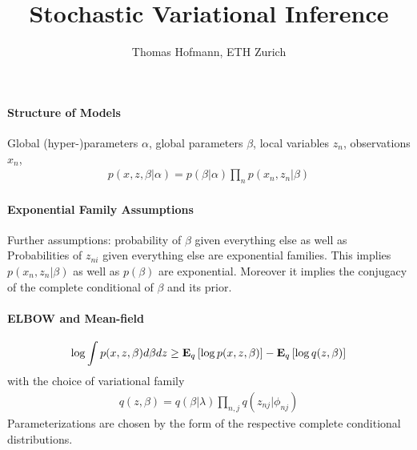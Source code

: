 \documentclass{article}
\title{Stochastic Variational Inference}
\author{Thomas Hofmann, ETH Zurich}
\newcommand{\E}{{\bf E}}
\begin{document}
\maketitle 

\paragraph{Structure of Models} Global (hyper-)parameters $\alpha$, global parameters $\beta$, local variables $z_n$, observations $x_n$, 
\begin{align}
p(x,z,\beta|\alpha) = p(\beta|\alpha) \prod_n p(x_n,z_n|\beta) 
\end{align}

\paragraph{Exponential Family Assumptions} Further assumptions: probability of $\beta$ given everything else  as well as Probabilities of $z_{ni}$ given everything else are exponential families. This implies $p(x_n,z_n| \beta)$ as well as $p(\beta)$ are exponential.  Moreover it implies the conjugacy of the complete conditional of $\beta$ and its prior. 

\paragraph{ELBOW and Mean-field} 
\begin{align}
\log \int p(x,z,\beta) d \beta dz \geq \E_q\left[ \log p(x,z,\beta) \right] - \E_q \left[ \log q(z,\beta) \right]
\end{align}
with the choice of variational family 
\begin{align}
q(z,\beta) = q(\beta| \lambda) \prod_{n,j} q(z_{nj} | \phi_{nj})
\end{align}
Parameterizations are chosen by the form of the respective complete conditional distributions. 


\end{document}
